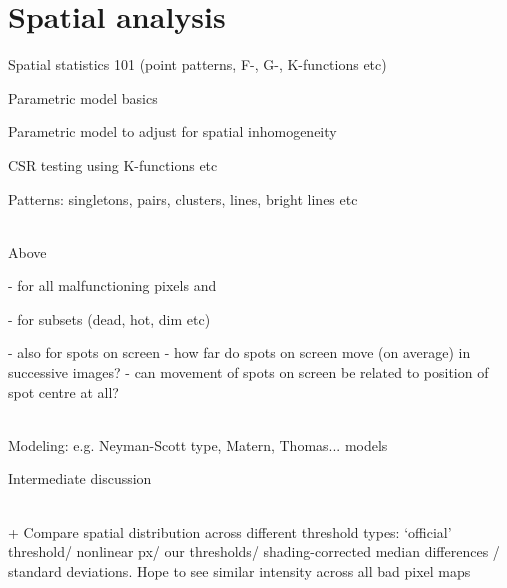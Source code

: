 \documentclass[../../IO-Pixels.tex]{subfiles}
\begin{document}
\section{Spatial analysis}
\begin{outline}
Spatial statistics 101 (point patterns, F-, G-, K-functions etc)

Parametric model basics

Parametric model to adjust for spatial inhomogeneity

CSR testing using K-functions etc

Patterns: singletons, pairs, clusters, lines, bright lines etc

\\
Above 

- for all malfunctioning pixels and 

- for subsets (dead, hot, dim etc)

- also for spots on screen
- how far do spots on screen move (on average) in successive images?
- can movement of spots on screen be related to position of spot centre at all?

\\
Modeling: e.g. Neyman-Scott type, Matern, Thomas... models

Intermediate discussion

\\
+ Compare spatial distribution across different threshold types: `official' threshold/ nonlinear px/ our thresholds/ shading-corrected median differences / standard deviations. Hope to see similar intensity across all bad pixel maps
\end{outline}



\end{document}
